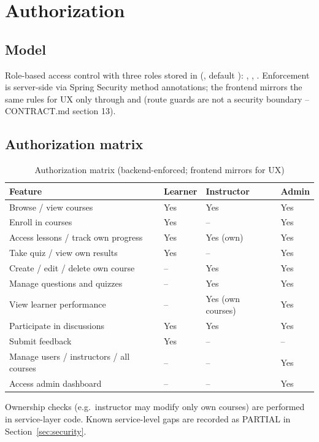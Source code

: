 \section{Authorization}
\label{sec:authorization}

\subsection{Model}

Role-based access control with three roles stored in  (, default ): , , . Enforcement is server-side via Spring Security method annotations; the frontend mirrors the same rules for UX only through  and  (route guards are not a security boundary -- CONTRACT.md section 13).

\subsection{Authorization matrix}

\begin{table}[H]
\centering
\caption{Authorization matrix (backend-enforced; frontend mirrors for UX)}
\label{tab:authz-matrix}
\begin{tabular}{@{}L{5.2cm}C{2.2cm}C{2.2cm}C{2.2cm}@{}}
\toprule
\textbf{Feature} & \textbf{Learner} & \textbf{Instructor} & \textbf{Admin} \\
\midrule
Browse / view courses & Yes & Yes & Yes \\
Enroll in courses & Yes & -- & Yes \\
Access lessons / track own progress & Yes & Yes (own) & Yes \\
Take quiz / view own results & Yes & -- & Yes \\
Create / edit / delete own course & -- & Yes & Yes \\
Manage questions and quizzes & -- & Yes & Yes \\
View learner performance & -- & Yes (own courses) & Yes \\
Participate in discussions & Yes & Yes & Yes \\
Submit feedback & Yes & -- & -- \\
Manage users / instructors / all courses & -- & -- & Yes \\
Access admin dashboard & -- & -- & Yes \\
\bottomrule
\end{tabular}
\end{table}

\noindent Ownership checks (e.g.\ instructor may modify only own courses) are performed in service-layer code. Known service-level gaps are recorded as PARTIAL in Section~\ref{sec:security}.
